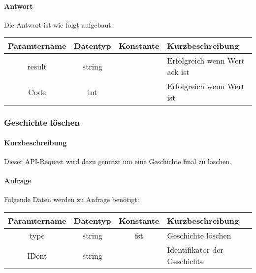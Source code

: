 \paragraph{Antwort}Die Antwort ist wie folgt aufgebaut:
\begin{table}[H]
	\begin{tabular}{|c|c|c|p{6.5cm}|}
		\hline
		\textbf{Paramtername} & \textbf{Datentyp} & \textbf{Konstante} & \textbf{Kurzbeschreibung}                                                                                               \\ \hline
		result              & string           &                 & Erfolgreich wenn Wert {\glqq ack\grqq} ist \\ \hline
		Code                & int              &                 & Erfolgreich wenn Wert {\glqq 0\grqq} ist \\ \hline
	\end{tabular}
\end{table}

\subsubsection{Geschichte löschen}
\paragraph{Kurzbeschreibung}Dieser API-Request wird dazu genutzt um eine Geschichte final zu löschen.
\paragraph{Anfrage}Folgende Daten werden zu Anfrage benötigt:
\begin{table}[H]
	\begin{tabular}{|c|c|c|p{6.5cm}|}
		\hline
		\textbf{Paramtername} & \textbf{Datentyp} & \textbf{Konstante} & \textbf{Kurzbeschreibung}                                                                                               \\ \hline
		type                & string            & fst               & Geschichte löschen \\ \hline
		IDent               & string            &                   & Identifikator der Geschichte \\ \hline
	\end{tabular}
\end{table}

